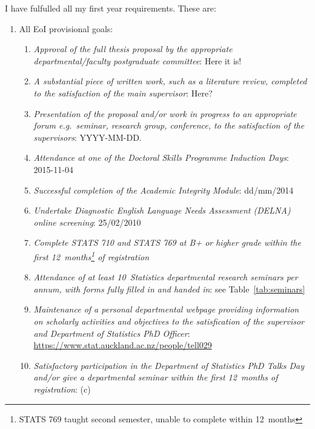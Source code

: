\documentclass[12pt,a4paper]{article}
\begin{document}
I have fulfulled all my first year requirements.
These are:
\begin{enumerate}

\item
All EoI provisional goals:
\begin{enumerate}

\item
\textit{Approval of the full thesis proposal by the appropriate departmental/faculty postgraduate
committee}:
Here it is!

\item
\textit{A substantial piece of written work, such as a literature review, completed to the
satisfaction of the main supervisor}: Here?


\item
\textit{Presentation of the proposal and/or work in progress to an appropriate forum e.g.\ seminar,
research group, conference, to the satisfaction of the supervisors}:
YYYY-MM-DD.

\item
\textit{Attendance at one of the Doctoral Skills Programme
Induction Days}:
2015-11-04

\item
\textit{Successful completion of the Academic Integrity Module}:
dd/mm/2014

\item
\textit{Undertake Diagnostic English Language Needs Assessment (DELNA) online screening}:
25/02/2010

\item
\textit{Complete STATS 710 and STATS 769 at B+ or higher grade within the first
12~months\footnote{STATS 769 taught second semester, unable to complete within 12~months}
of registration}

\item
\textit{Attendance of at least 10~Statistics departmental research seminars per annum,
with forms fully filled in and handed in}:
see Table~\ref{tab:seminars}

\item
\textit{Maintenance of a personal departmental webpage providing information on scholarly
activities and objectives to the satisfication of the supervisor and Department of Statistics
PhD Officer}:
\url{https://www.stat.auckland.ac.nz/people/tell029}

\item
\textit{Satisfactory participation in the Department of Statistics PhD Talks Day and/or give
a departmental seminar within the first 12~months of registration}:
(c)



\end{enumerate}
\end{enumerate}
\end{document}
